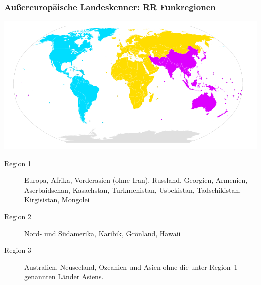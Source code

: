 \begin{frame}
    \frametitle{Außereuropäische Landeskenner: RR Funkregionen}

    \begin{center}
      \includegraphics[width=.7\textheight]{bv06/International_Telecommunication_Union_region-800px.png}
      \tiny \hyperlink{refs}{\cite{wc}}
    \end{center}

    \small{
    \begin{description}
        \item[Region 1] Europa, Afrika, Vorderasien (ohne Iran), Russland, Georgien,
                        Armenien, Aserbaidschan, Kasachstan, Turkmenistan,
                        Usbekistan, Tadschikistan, Kirgisistan, Mongolei
        \item[Region 2] Nord- und Südamerika, Karibik, Grönland, Hawaii
        \item[Region 3] Australien, Neuseeland, Ozeanien und Asien ohne die unter
                        Region~1 genannten Länder Asiens.
    \end{description}
    }

\end{frame}

